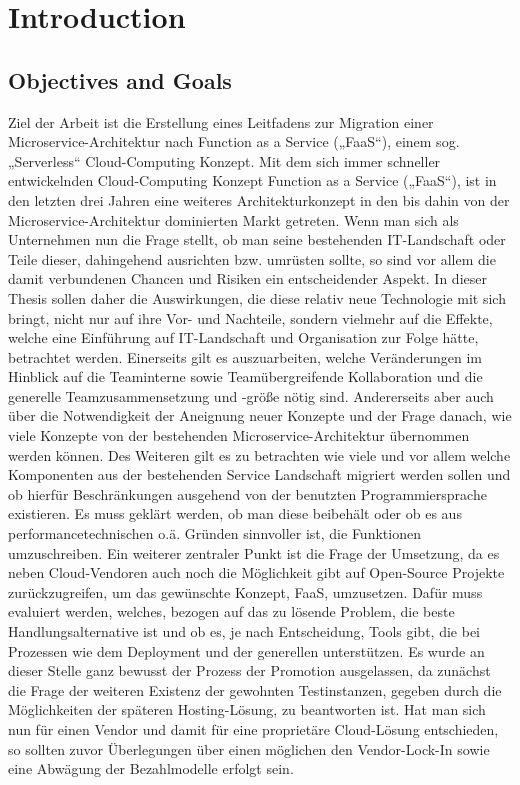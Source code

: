 \documentclass[11pt]{article}
\begin{document}
\section{Introduction}

\subsection{Objectives and Goals}
Ziel der Arbeit ist die Erstellung eines Leitfadens zur Migration einer Microservice-Architektur nach Function as a Service („FaaS“), einem sog. „Serverless“ Cloud-Computing Konzept.
Mit dem sich immer schneller entwickelnden Cloud-Computing Konzept Function as a Service („FaaS“), ist in den letzten drei Jahren eine weiteres Architekturkonzept in den bis dahin von der Microservice-Architektur dominierten Markt getreten. Wenn man sich als Unternehmen nun die Frage stellt, ob man seine bestehenden IT-Landschaft oder Teile dieser, dahingehend ausrichten bzw. umrüsten sollte, so sind vor allem die damit verbundenen Chancen und Risiken ein entscheidender Aspekt. 
In dieser Thesis sollen daher die Auswirkungen, die diese relativ neue Technologie mit sich bringt, nicht nur auf ihre Vor- und Nachteile, sondern vielmehr auf die Effekte, welche eine Einführung auf IT-Landschaft und Organisation zur Folge hätte, betrachtet werden. Einerseits gilt es auszuarbeiten, welche Veränderungen im Hinblick auf die Teaminterne sowie Teamübergreifende Kollaboration und die generelle Teamzusammensetzung und -größe nötig sind. Andererseits aber auch über die Notwendigkeit der Aneignung neuer Konzepte und der Frage danach, wie viele Konzepte von der bestehenden Microservice-Architektur übernommen werden können. Des Weiteren gilt es zu betrachten wie viele und vor allem welche Komponenten aus der bestehenden Service Landschaft migriert werden sollen und ob hierfür Beschränkungen ausgehend von der benutzten Programmiersprache existieren. Es muss geklärt werden, ob man diese beibehält oder ob es aus performancetechnischen o.ä. Gründen sinnvoller ist, die Funktionen umzuschreiben. Ein weiterer zentraler Punkt ist die Frage der Umsetzung, da es neben Cloud-Vendoren auch noch die Möglichkeit gibt auf Open-Source Projekte zurückzugreifen, um das gewünschte Konzept, FaaS, umzusetzen. Dafür muss evaluiert werden, welches, bezogen auf das zu lösende Problem, die beste Handlungsalternative ist und ob es, je nach Entscheidung, Tools gibt, die bei Prozessen wie dem Deployment und der generellen unterstützen. Es wurde an dieser Stelle ganz bewusst der Prozess der Promotion ausgelassen, da zunächst die Frage der weiteren Existenz der gewohnten Testinstanzen, gegeben durch die Möglichkeiten der späteren Hosting-Lösung, zu beantworten ist. Hat man sich nun für einen Vendor und damit für eine proprietäre Cloud-Lösung entschieden, so sollten zuvor Überlegungen über einen möglichen den Vendor-Lock-In sowie eine Abwägung der Bezahlmodelle erfolgt sein. 
\end{document}
